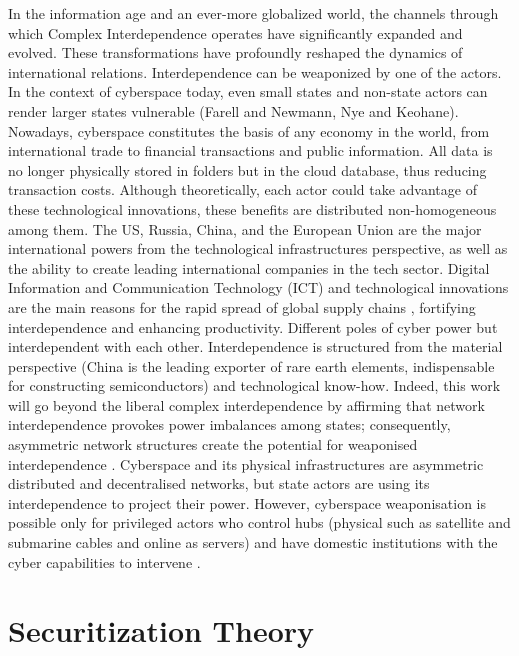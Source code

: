 In the information age and an ever-more globalized world, the channels through which Complex Interdependence operates have significantly expanded and evolved. These transformations have profoundly reshaped the dynamics of international relations. Interdependence can be weaponized by one of the actors. In the context of cyberspace today, even small states and non-state actors can render larger states vulnerable \parencite{farrell_2019_weaponized, nye_1971_transnational}(Farell and Newmann, Nye and Keohane). Nowadays, cyberspace constitutes the basis of any economy in the world, from international trade to financial transactions and public information. All data is no longer physically stored in folders but in the cloud database, thus reducing transaction costs. Although theoretically, each actor could take advantage of these technological innovations, these benefits are distributed non-homogeneous among them. The US, Russia, China, and the European Union are the major international powers from the technological infrastructures perspective, as well as the ability to create leading international companies in the tech sector. Digital Information and Communication Technology (ICT) and technological innovations are the main reasons for the rapid spread of global supply chains \autocite{mansfield_2021_embedded}, fortifying interdependence and enhancing productivity. Different poles of cyber power but interdependent with each other. Interdependence is structured from the material perspective (China is the leading exporter of rare earth elements, indispensable for constructing semiconductors) and technological know-how. Indeed, this work will go beyond the liberal complex interdependence by affirming that network interdependence provokes power imbalances among states; consequently, asymmetric network structures create the potential for weaponised interdependence \autocite[45]{farrell_2019_weaponized}. Cyberspace and its physical infrastructures are asymmetric distributed and decentralised networks, but state actors are using its interdependence to project their power. However, cyberspace weaponisation is possible only for privileged actors who control hubs (physical such as satellite and submarine cables and online as servers) and have domestic institutions with the cyber capabilities to intervene \autocite{farrell_2019_weaponized}.

\section{Securitization Theory}


